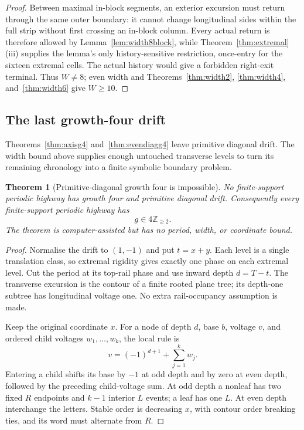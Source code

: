 \documentclass[11pt,letterpaper]{article}
\theoremstyle{plain}
\newtheorem{theorem}{Theorem}[section]
\theoremstyle{definition}
\newcommand{\Z}{\mathbb{Z}}
\newcommand{\growth}{g}
\begin{document}
\begin{NoHyper}
\begin{proof}
Between maximal in-block segments, an exterior excursion must return through the
same outer boundary: it cannot change longitudinal sides within the full strip
without first crossing an in-block column.  Every actual return is therefore allowed
by Lemma~\ref{lem:width8block}, while Theorem~\ref{thm:extremal}(iii) supplies the
lemma's only history-sensitive restriction, once-entry for the sixteen extremal
cells.  The actual history would give a forbidden right-exit terminal.  Thus $W\ne8$;
even width and Theorems~\ref{thm:width2}, \ref{thm:width4}, and~\ref{thm:width6}
give $W\ge10$.
\end{proof}

\subsection{The last growth-four drift}

Theorems~\ref{thm:axisg4} and~\ref{thm:evendiagg4} leave primitive diagonal
drift.  The width bound above supplies enough untouched transverse levels to
turn its remaining chronology into a finite symbolic boundary problem.

\begin{theorem}[Primitive-diagonal growth four is impossible]\label{thm:primg4excl}
No finite-support periodic highway has growth four and primitive diagonal drift.
Consequently every finite-support periodic highway has
\[
\growth\in4\Z_{\ge2}.
\]
The theorem is computer-assisted but has no period, width, or coordinate bound.
\end{theorem}

\begin{proof}
Normalise the drift to $(1,-1)$ and put $t=x+y$. Each level is a
single translation class, so extremal rigidity gives exactly one phase
on each extremal level. Cut the period at its top-rail phase and use
inward depth $d=T-t$. The transverse excursion is the contour of a
finite rooted plane tree; its depth-one subtree has longitudinal
voltage one. No extra rail-occupancy assumption is made.

Keep the original coordinate $x$. For a node of depth $d$, base $b$,
voltage $v$, and ordered child voltages $w_1,\ldots,w_k$, the local rule is
\begin{equation}\label{eq:topvoltage}
v=(-1)^{d+1}+\sum_{j=1}^k w_j.
\end{equation}
Entering a child shifts its base by $-1$ at odd depth and by zero at even
depth, followed by the preceding child-voltage sum. At odd depth a
nonleaf has two fixed $R$ endpoints and $k-1$ interior $L$ events; a leaf
has one $L$. At even depth interchange the letters. Stable order is
decreasing $x$, with contour order breaking ties, and its word must
alternate from $R$.


\end{proof}
\end{NoHyper}
\end{document}
